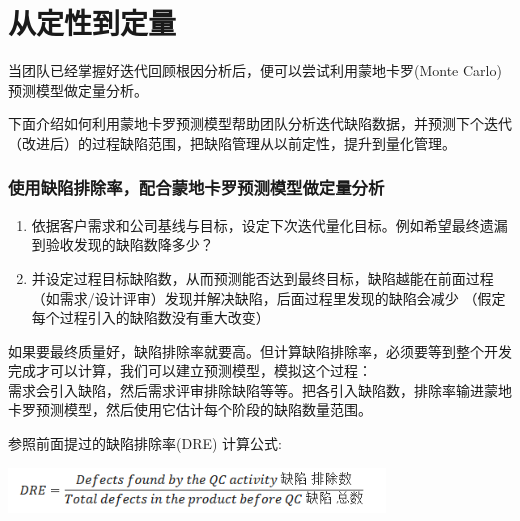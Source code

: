 \chapter{从定性到定量} %

当团队已经掌握好迭代回顾根因分析后，便可以尝试利用蒙地卡罗(Monte
Carlo)预测模型做定量分析。

下面介绍如何利用蒙地卡罗预测模型帮助团队分析迭代缺陷数据，并预测下个迭代（改进后）的过程缺陷范围，把缺陷管理从以前定性，提升到量化管理。

\hypertarget{ux4f7fux7528ux7f3aux9677ux6392ux9664ux7387ux914dux5408ux8499ux5730ux5361ux7f57ux9884ux6d4bux6a21ux578bux505aux5b9aux91cfux5206ux6790}{%
\subsection{使用缺陷排除率，配合蒙地卡罗预测模型做定量分析}\label{ux4f7fux7528ux7f3aux9677ux6392ux9664ux7387ux914dux5408ux8499ux5730ux5361ux7f57ux9884ux6d4bux6a21ux578bux505aux5b9aux91cfux5206ux6790}}

\begin{enumerate}
\tightlist
\item
  依据客户需求和公司基线与目标，设定下次迭代量化目标。例如希望最终遗漏到验收发现的缺陷数降多少？
\item
  并设定过程目标缺陷数，从而预测能否达到最终目标，缺陷越能在前面过程（如需求/设计评审）发现并解决缺陷，后面过程里发现的缺陷会减少
  （假定每个过程引入的缺陷数没有重大改变）
\end{enumerate}

如果要最终质量好，缺陷排除率就要高。但计算缺陷排除率，必须要等到整个开发完成才可以计算，我们可以建立预测模型，模拟这个过程：\\
需求会引入缺陷，然后需求评审排除缺陷等等。把各引入缺陷数，排除率输进蒙地卡罗预测模型，然后使用它估计每个阶段的缺陷数量范围。

参照前面提过的缺陷排除率(DRE) 计算公式:


\includegraphics[width=10cm]{Ma3_10.png}


